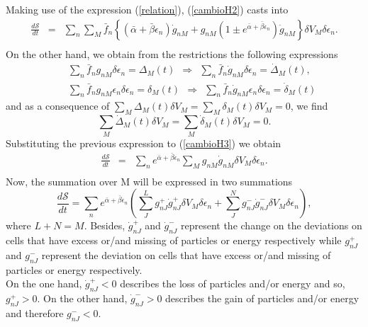 \documentclass{article}
\newcommand{\de}{\delta}
\newcommand{\Ss}{\mathcal{S}}
\begin{document}
Making use of the expression (\ref{relation}),
(\ref{cambioH2}) casts into
\begin{eqnarray}
    \frac{d\Ss}{dt}&=&\sum_n \sum_M \bar{f}_n\left \{ (\bar{\alpha}+\bar{\beta}{\epsilon}_n)\dot{g}_{nM}+ g_{nM}\left(1\pm e^{\bar{\alpha}+\bar{\beta}{\epsilon}_n}\right)\dot{g}_{nM} \right \} \de V_M \delta \epsilon_n. \nonumber \\
    \label{cambioH3}
\end{eqnarray}{}
On the other hand, we obtain from the restrictions the following expressions
\begin{eqnarray}
    &&\sum_n \bar{f}_n g_{nM} \delta \epsilon_n=\Delta_M(t) \ \  \Rightarrow \ \  \sum_n \bar{f}_n \dot{g}_{nM} \delta \epsilon_n=\dot{\Delta}_M(t), \nonumber \\
    &&\sum_n  \bar{f}_n g_{nM}\epsilon_n \delta \epsilon_n=\delta_M(t) \ \  \Rightarrow \ \  \sum_n \bar{f}_n \dot{g}_{nM}\epsilon_n \delta \epsilon_n=\dot{\delta}_M(t)
\end{eqnarray}{}
and as a consequence of $\sum_M \Delta_M(t) \de V_M  =\sum_M \delta_M(t) \de V_M =0$, we find
\begin{equation}
    \sum_M \dot{\Delta}_M(t) \de V_M =\sum_M \dot{\delta}_{M}(t) \de V_M=0.
\end{equation}{}
Substituting the previous expression to (\ref{cambioH3}) we obtain
\begin{eqnarray}
   \frac{d\Ss}{dt}&=&  \sum_n e^{\bar{\alpha}+\bar{\beta}\epsilon_n}\sum_M  g_{nM}\dot{g}_{nM} \de V_M\delta \epsilon_n. \nonumber \\ \label{cambioH4}
\end{eqnarray}{}
Now, the summation over M will be expressed in two summations
\begin{equation}
    \frac{d\Ss}{dt}=\sum_n  e^{\bar{\alpha}+\bar{\beta}\epsilon_n}\left(\sum_J ^{L} g^{+}_{nJ}\dot{g}^{+}_{nJ}\de V_M \delta \epsilon_n+\sum^{N}_J  g^{-}_{nJ}\dot{g}^{-}_{nJ} \de V_M\delta \epsilon_n \right), \label{cambioH5}
\end{equation}{}
where $L+N=M$. Besides, $\dot{g}^{+}_{nJ}$ and $\dot{g}^{-}_{nJ}$  represent the change on the deviations on cells that have excess or/and missing of particles or energy respectively while $g^{+}_{nJ}$ and $g^{-}_{nJ}$ represent the deviation on cells that have excess or/and missing of particles or energy respectively.\\
On the one hand, $\dot{g}^{+}_{nJ}<0$ describes the loss of particles and/or energy and so, $g^{+}_{nJ}>0$. On the other hand, $\dot{g}^{-}_{nJ}>0$ describes the gain of particles and/or energy and therefore $g^{-}_{nJ}<0$. \\
\end{document}
